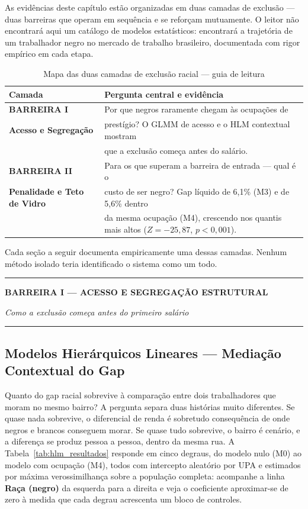 \documentclass[12pt, a4paper, oneside]{article}
\let\oldsubsectionFB\subsection
\renewcommand{\subsection}{\FloatBarrier\oldsubsectionFB}
\begin{document}
As evidências deste capítulo estão organizadas em duas camadas de exclusão
--- duas barreiras que operam em sequência e se reforçam mutuamente.
O leitor não encontrará aqui um catálogo de modelos estatísticos:
encontrará a trajetória de um trabalhador negro no mercado de trabalho
brasileiro, documentada com rigor empírico em cada etapa.

\begin{table}[ht]
\centering
\caption{Mapa das duas camadas de exclusão racial --- guia de leitura}
\label{tab:mapa_barreiras}
\begin{tabularx}{\textwidth}{|l|X|}
\hline
\textbf{Camada} & \textbf{Pergunta central e evidência} \\
\hline
\textbf{BARREIRA I} & Por que negros raramente chegam às ocupações de \\
\textbf{Acesso e Segregação} & prestígio? O GLMM de acesso e o HLM contextual mostram \\
 & que a exclusão começa antes do salário. \\
\hline
\textbf{BARREIRA II} & Para os que superam a barreira de entrada --- qual é o \\
\textbf{Penalidade e Teto de Vidro} & custo de ser negro? Gap líquido de 6,1\% (M3) e de 5,6\% dentro \\
 & da mesma ocupação (M4), crescendo nos quantis mais altos ($Z=-25{,}87$, $p<0{,}001$). \\
\hline
\end{tabularx}
\end{table}

\medskip

Cada seção a seguir documenta empiricamente uma dessas camadas.
Nenhum método isolado teria identificado o sistema como um todo.

\noindent\rule{\textwidth}{1pt}\par
\textbf{\large BARREIRA I --- ACESSO E SEGREGAÇÃO ESTRUTURAL}\par
\textit{Como a exclusão começa antes do primeiro salário}\par
\noindent\rule{\textwidth}{1pt}

\subsection{Modelos Hierárquicos Lineares --- Mediação Contextual do Gap}
\label{subsec:hlm_resultados}

Quanto do gap racial sobrevive à comparação entre dois trabalhadores que moram no
mesmo bairro? A pergunta separa duas histórias muito diferentes. Se quase nada
sobrevive, o diferencial de renda é sobretudo consequência de onde negros e brancos
conseguem morar. Se quase tudo sobrevive, o bairro é cenário, e a diferença se produz
pessoa a pessoa, dentro da mesma rua. A Tabela~\ref{tab:hlm_resultados} responde em
cinco degraus, do modelo nulo (M0) ao modelo com ocupação (M4), todos com intercepto
aleatório por UPA e estimados por máxima verossimilhança sobre a população completa:
acompanhe a linha \textbf{Raça (negro)} da esquerda para a direita e veja o coeficiente
aproximar-se de zero à medida que cada degrau acrescenta um bloco de controles.
\end{document}
